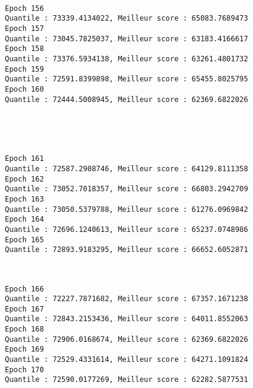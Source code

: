 \documentclass[11pt]{article}
\begin{document}
    \begin{center}
    \end{center}
    { \hspace*{\fill} \\}
    
    \begin{Verbatim}[commandchars=\\\{\}]
Epoch 156
Quantile : 73339.4134022, Meilleur score : 65083.7689473
Epoch 157
Quantile : 73045.7825037, Meilleur score : 63183.4166617
Epoch 158
Quantile : 73376.5934138, Meilleur score : 63261.4801732
Epoch 159
Quantile : 72591.8399898, Meilleur score : 65455.8025795
Epoch 160
Quantile : 72444.5008945, Meilleur score : 62369.6822026

    \end{Verbatim}

    \begin{center}
    \end{center}
    { \hspace*{\fill} \\}
    
    \begin{center}
    \end{center}
    { \hspace*{\fill} \\}
    
    \begin{Verbatim}[commandchars=\\\{\}]
Epoch 161
Quantile : 72587.2908746, Meilleur score : 64129.8111358
Epoch 162
Quantile : 73052.7018357, Meilleur score : 66803.2942709
Epoch 163
Quantile : 73050.5379788, Meilleur score : 61276.0969842
Epoch 164
Quantile : 72696.1240613, Meilleur score : 65237.0748986
Epoch 165
Quantile : 72893.9183295, Meilleur score : 66652.6052871

    \end{Verbatim}

    \begin{center}
    \end{center}
    { \hspace*{\fill} \\}
    
    \begin{Verbatim}[commandchars=\\\{\}]
Epoch 166
Quantile : 72227.7871682, Meilleur score : 67357.1671238
Epoch 167
Quantile : 72843.2153436, Meilleur score : 64011.8552063
Epoch 168
Quantile : 72906.0168674, Meilleur score : 62369.6822026
Epoch 169
Quantile : 72529.4331614, Meilleur score : 64271.1091824
Epoch 170
Quantile : 72590.0177269, Meilleur score : 62282.5877531

    \end{Verbatim}
\end{document}

